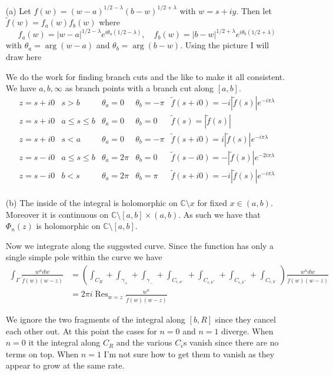 \documentclass[10pt]{article}
\newcommand{\bb}[1]{\mathbb{#1}}
\newcommand{\wt}[1]{\widetilde{#1}}
\DeclareMathOperator{\res}{Res}
\theoremstyle{plain}
\theoremstyle{remark}
\begin{document}
\begin{enumerate}
\item[(a)] Let $f(w)=(w-a)^{1/2-\lambda}(b-w)^{1/2+\lambda}$ with $w=s+iy$. Then let $\wt{f}(w)=f_a(w)f_b(w)$
  where
  \[
    f_a(w)=|w-a|^{1/2-\lambda}e^{i\theta_a(1/2-\lambda)},\quad f_b(w)=|b-w|^{1/2+\lambda}e^{i\theta_b(1/2+\lambda)}
  \]
  with $\theta_a=\arg(w-a)$ and $\theta_b=\arg(b-w)$. Using the picture I will draw here

  \vskip2in

  We do the work for finding branch cuts and the like to make it all consistent.
  We have $a,b,\infty$ as branch points with a branch cut along $[a,b]$.
  \begin{align*}
    z=s+i0 & s>b & \theta_a=0 & \theta_b =-\pi & \wt{f}(s+i0)=-i|\wt{f}(s)|e^{-i\pi\lambda}\\
    z=s+i0 & a\leq s\leq b & \theta_a=0 & \theta_b =0 & \wt{f}(s)=|\wt{f}(s)|\\
    z=s+i0 & s<a & \theta_a=0 & \theta_b =-\pi & \wt{f}(s+i0)=i|\wt{f}(s)|e^{-i\pi\lambda}\\
    z=s-i0 & a\leq s\leq b & \theta_a=2\pi & \theta_b =0 & \wt{f}(s-i0)=-|\wt{f}(s)|e^{-2i\pi\lambda}\\
    z=s-i0 & b<s & \theta_a=2\pi & \theta_b =\pi & \wt{f}(s+i0)=-i|\wt{f}(s)|e^{-i\pi\lambda}\\
  \end{align*}
\item[(b)] The inside of the integral is holomorphic on $\bb{C}\setminus x$ for fixed $x\in(a,b)$.
  Moreover it is continuous on $\bb{C}\setminus[a,b]\times(a,b)$. As such we have that $\Phi_n(z)$ is holomorphic
  on $\bb{C}\setminus[a,b]$.

  Now we integrate along the suggested curve. Since the function has only a single
  simple pole within the curve we have
  \begin{align*}
    \int_\Gamma \frac{w^n dw}{\wt{f}(w)(w-z)}&=\left(\int_{C_R}+\int_{\gamma_+}+\int_{\gamma_-}+\int_{C_{\epsilon,a^-}}+\int_{C_{\epsilon,b^+}}+\int_{C_{\epsilon,b^+}}+\int_{C_{\epsilon,b^-}}\right)\frac{w^n dw}{\wt{f}(w)(w-z)}\\
                                    &=2\pi i\res_{w=z}\frac{w^n }{\wt{f}(w)(w-z)}    
  \end{align*}

  We ignore the two fragments of the integral along $[b,R]$ since they cancel each other out.
  At this point the cases for $n=0$ and $n=1$ diverge.
  When $n=0$ it the integral along $C_R$ and the various $C_{\epsilon}$s vanish since
  there are no terms on top. When $n=1$ I'm not sure how to get them to vanish
  as they appear to grow at the same rate.


\end{enumerate}
\end{document}
